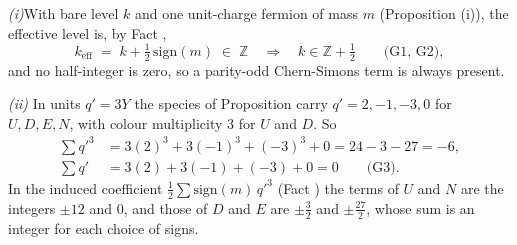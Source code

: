 \textit{(i)}\enspace With bare level $k$ and one unit-charge fermion of mass $m$ (Proposition (i)), the effective level is, by Fact ,
\[
k_{\mathrm{eff}} \;=\; k + \tfrac{1}{2}\,\mathrm{sign}(m) \;\in\; \mathbb{Z} \quad\Longrightarrow\quad k \in \mathbb{Z} + \tfrac{1}{2} \qquad \text{(G1, G2)},
\]
and no half-integer is zero, so a parity-odd Chern-Simons term is always present.



\emph{(ii)}  In units $q' = 3Y$ the species of Proposition  carry $q' = 2, -1, -3, 0$ for $U, D, E, N$, with colour multiplicity $3$ for $U$ and $D$. So
\begin{align*}
\sum q'^{3} &= 3(2)^{3} + 3(-1)^{3} + (-3)^{3} + 0 = 24 - 3 - 27 = -6, \\
\sum q' &= 3(2) + 3(-1) + (-3) + 0 = 0 \qquad \text{(G3)}.
\end{align*}
In the induced coefficient $\tfrac{1}{2}\sum \mathrm{sign}(m)\,q'^{3}$ (Fact ) the terms of $U$ and $N$ are the integers $\pm 12$ and $0$, and those of $D$ and $E$ are $\pm\tfrac{3}{2}$ and $\pm\tfrac{27}{2}$, whose sum is an integer for each choice of signs.
